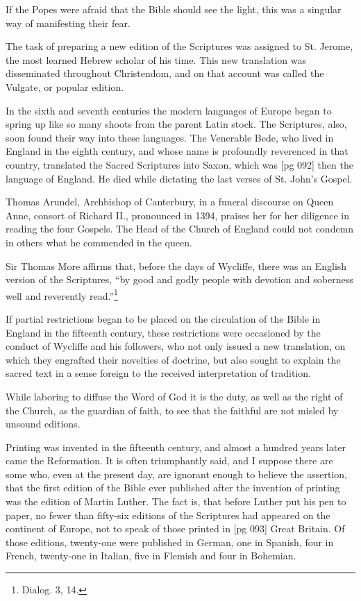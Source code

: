 If the Popes were afraid that the Bible should
see the light, this was a singular way of manifesting
their fear.

The task of preparing a new edition of the
Scriptures was assigned to St. Jerome, the most
learned Hebrew scholar of his time. This new
translation was disseminated throughout Christendom,
and on that account was called the Vulgate,
or popular edition.

In the sixth and seventh centuries the modern
languages of Europe began to spring up like so
many shoots from the parent Latin stock. The
Scriptures, also, soon found their way into these
languages. The Venerable Bede, who lived in
England in the eighth century, and whose name
is profoundly reverenced in that country, translated
the Sacred Scriptures into Saxon, which was
[pg 092]
then the language of England. He died while dictating
the last verses of St. John's Gospel.

Thomas Arundel, Archbishop of Canterbury, in
a funeral discourse on Queen Anne, consort of
Richard II., pronounced in 1394, praises her for
her diligence in reading the four Gospels. The
Head of the Church of England could not condemn
in others what he commended in the queen.

Sir Thomas More affirms that, before the days
of Wycliffe, there was an English version of the
Scriptures, “by good and godly people with devotion
and soberness well and reverently read.”\footnote{Dialog.
3, 14.}

If partial restrictions began to be placed on the
circulation of the Bible in England in the fifteenth
century, these restrictions were occasioned by the
conduct of Wycliffe and his followers, who not
only issued a new translation, on which they engrafted
their novelties of doctrine, but also sought
to explain the sacred text in a sense foreign to the
received interpretation of tradition.

While laboring to diffuse the Word of God it
is the duty, as well as the right of the Church,
as the guardian of faith, to see that the faithful
are not misled by unsound editions.

Printing was invented in the fifteenth century,
and almost a hundred years later came the Reformation.
It is often triumphantly said, and
I suppose there are some who, even at the present
day, are ignorant enough to believe the assertion,
that the first edition of the Bible ever published
after the invention of printing was the edition of
Martin Luther. The fact is, that before Luther
put his pen to paper, no fewer than fifty-six editions
of the Scriptures had appeared on the continent
of Europe, not to speak of those printed in
[pg 093]
Great Britain. Of those editions, twenty-one were
published in German, one in Spanish, four in
French, twenty-one in Italian, five in Flemish and
four in Bohemian.

